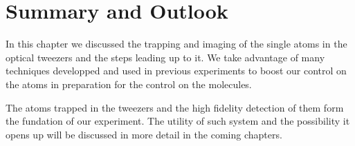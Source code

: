 

\section{Summary and Outlook}
\label{ch:loading:summary}

In this chapter we discussed the trapping and imaging of the single atoms in the optical
tweezers and the steps leading up to it.
We take advantage of many techniques developped and used in previous experiments
to boost our control on the atoms in preparation for the control on the molecules.

The atoms trapped in the tweezers and the high fidelity detection of them
form the fundation of our experiment.
The utility of such system and the possibility it opens up will be discussed
in more detail in the coming chapters.

